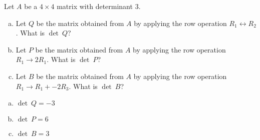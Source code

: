 
\begin{exerciseStatement}


Let \(A\) be a \(4 \times 4\) matrix with determinant \( 3 \).


\begin{enumerate}[(a)]
\item Let \(Q\) be the matrix obtained from \(A\) by applying the row operation \( R_1 \leftrightarrow R_2 \). What is \(\operatorname{det}\ Q\)?
\item Let \(P\) be the matrix obtained from \(A\) by applying the row operation \( R_1 \to 2R_1 \). What is \(\operatorname{det}\ P\)?
\item Let \(B\) be the matrix obtained from \(A\) by applying the row operation \( R_1 \to R_1 + -2R_3 \). What is \(\operatorname{det}\ B\)?
\end{enumerate}
    
\end{exerciseStatement}
    
\begin{exerciseAnswer} 

\begin{enumerate}[(a)]
\item \(\operatorname{det}\ Q= -3 \)
\item \(\operatorname{det}\ P= 6 \)
\item \(\operatorname{det}\ B= 3 \)
\end{enumerate}
    
\end{exerciseAnswer}
    
